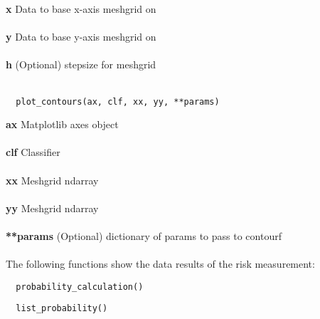 \noindent\textbf{x}
Data to base x-axis meshgrid on \\ \\
\textbf{y}
Data to base y-axis meshgrid on \\ \\
\textbf{h}
(Optional) stepsize for meshgrid \\ \\

\begin{lstlisting}
  plot_contours(ax, clf, xx, yy, **params)
\end{lstlisting}

\noindent\textbf{ax}
Matplotlib axes object \\ \\
\textbf{clf}
Classifier \\ \\
\textbf{xx}
Meshgrid ndarray \\ \\
\textbf{yy}
Meshgrid ndarray \\ \\
\textbf{**params}
(Optional) dictionary of params to pass to contourf \\ \\

The following functions show the data results of the risk measurement: \\

\begin{lstlisting}
  probability_calculation()
\end{lstlisting}

\begin{lstlisting}
  list_probability()
\end{lstlisting}
